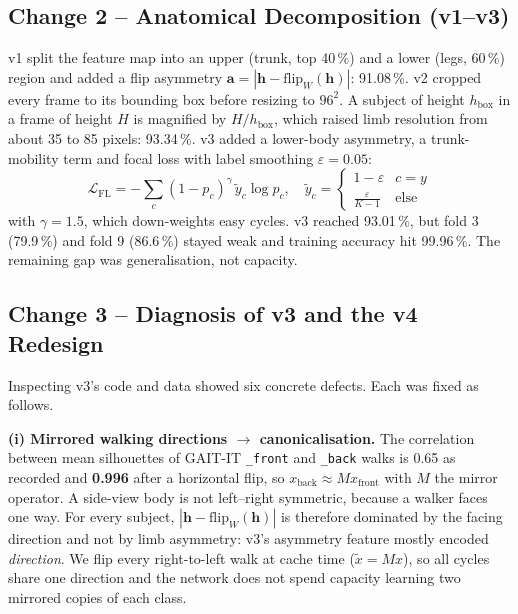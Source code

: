 \documentclass[conference]{IEEEtran}
\begin{document}
\subsection{Change 2 -- Anatomical Decomposition (v1--v3)}
v1 split the feature map into an upper (trunk, top 40\,\%) and a lower (legs,
60\,\%) region and added a flip asymmetry
$\mathbf{a}=|\mathbf{h}-\mathrm{flip}_W(\mathbf{h})|$: 91.08\,\%. v2 cropped
every frame to its bounding box before resizing to $96^2$. A subject of height
$h_{\text{box}}$ in a frame of height $H$ is magnified by $H/h_{\text{box}}$,
which raised limb resolution from about 35 to 85 pixels: 93.34\,\%. v3 added a
lower-body asymmetry, a trunk-mobility term and focal loss with label smoothing
$\varepsilon=0.05$:
\begin{equation}
\mathcal{L}_{\text{FL}}=-\textstyle\sum_c (1-p_c)^{\gamma}\,
\tilde{y}_c\log p_c,\quad
\tilde{y}_c=\begin{cases}1-\varepsilon & c=y\\ \frac{\varepsilon}{K-1}&
\text{else}\end{cases}
\end{equation}
with $\gamma=1.5$, which down-weights easy cycles. v3 reached 93.01\,\%, but
fold 3 (79.9\,\%) and fold 9 (86.6\,\%) stayed weak and training accuracy hit
99.96\,\%. The remaining gap was generalisation, not capacity.

\subsection{Change 3 -- Diagnosis of v3 and the v4 Redesign}
\label{sec:c4}
Inspecting v3's code and data showed six concrete defects. Each was fixed as
follows.

\textbf{(i) Mirrored walking directions $\rightarrow$ canonicalisation.} The
correlation between mean silhouettes of GAIT-IT \texttt{\_front} and
\texttt{\_back} walks is 0.65 as recorded and \textbf{0.996} after a horizontal
flip, so $x_{\text{back}}\approx M x_{\text{front}}$ with $M$ the mirror
operator. A side-view body is not left--right symmetric, because a walker faces
one way. For every subject, $|\mathbf{h}-\mathrm{flip}_W(\mathbf{h})|$ is
therefore dominated by the facing direction and not by limb asymmetry: v3's
asymmetry feature mostly encoded \emph{direction}. We flip every right-to-left
walk at cache time ($\tilde{x}=Mx$), so all cycles share one direction and the
network does not spend capacity learning two mirrored copies of each class.
\end{document}
